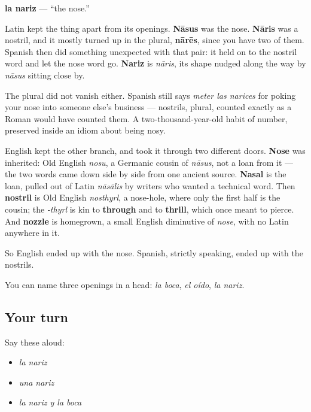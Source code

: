 \begin{cousinweb}
\textbf{la nariz} — \textquotedblleft{}the nose.\textquotedblright{}

Latin kept the thing apart from its openings. \textbf{Nāsus} was the nose. \textbf{Nāris} was a nostril, and it mostly turned up in the plural, \textbf{nārēs}, since you have two of them. Spanish then did something unexpected with that pair: it held on to the nostril word and let the nose word go. \textbf{Nariz} is \emph{nāris}, its shape nudged along the way by \emph{nāsus} sitting close by.

The plural did not vanish either. Spanish still says \emph{meter las narices} for poking your nose into someone else's business — nostrils, plural, counted exactly as a Roman would have counted them. A two-thousand-year-old habit of number, preserved inside an idiom about being nosy.

English kept the other branch, and took it through two different doors. \textbf{Nose} was inherited: Old English \emph{nosu}, a Germanic cousin of \emph{nāsus}, not a loan from it — the two words came down side by side from one ancient source. \textbf{Nasal} is the loan, pulled out of Latin \emph{nāsālis} by writers who wanted a technical word. Then \textbf{nostril} is Old English \emph{nosthyrl}, a nose-hole, where only the first half is the cousin; the \emph{-thyrl} is kin to \textbf{through} and to \textbf{thrill}, which once meant to pierce. And \textbf{nozzle} is homegrown, a small English diminutive of \emph{nose}, with no Latin anywhere in it.

So English ended up with the nose. Spanish, strictly speaking, ended up with the nostrils.
\end{cousinweb}

\begin{grammarlens}[title={What you've built}]
You can name three openings in a head: \emph{la boca}, \emph{el oído}, \emph{la nariz}.
\end{grammarlens}

\subsection*{Your turn}
Say these aloud:

\begin{itemize}
\raggedright
  \item \emph{la nariz}
  \item \emph{una nariz}
  \item \emph{la nariz y la boca}
\end{itemize}

